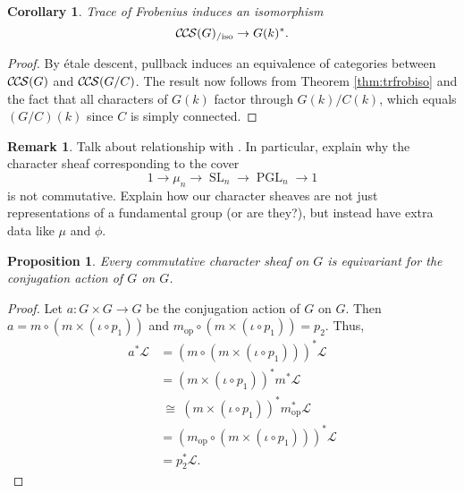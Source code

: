 \documentclass[10pt]{amsart}
\theoremstyle{plain}
\newtheorem{proposition}[theorem]{Proposition}
\newtheorem{corollary}[theorem]{Corollary}
\theoremstyle{definition}
\newtheorem{remark}[theorem]{Remark}
\newcommand{\Fq}{k}
\DeclareMathOperator{\SL}{SL}
\DeclareMathOperator{\PGL}{PGL}
\newcommand{\op}{_{\operatorname{op}}}
\newcommand{\iso}{{\ \cong\ }}
\newcommand{\cs}[1]{{\mathcal{#1}}}
\newcommand{\CCS}{{\mathcal{C\hskip-.8pt C\hskip-0.8pt S}}}
\newcommand{\CCSiso}[1]{\CCS(#1)_{/\text{iso}}}
\begin{document}
 \begin{corollary}
 Trace of Frobenius induces an isomorphism
 \[
 \CCSiso{G} \to G(\Fq)^*.
 \]
 \end{corollary}
 
 \begin{proof}
 By \'etale descent, pullback induces an equivalence of categories between $\CCS(G)$ and $\CCS(G/C)$. 
  The result now follows from Theorem \ref{thm:trfrobiso} and the fact that all characters of $G(\Fq)$ factor through
 $G(\Fq)/C(\Fq)$, which equals $(G/C)(\Fq)$ since $C$ is simply connected.
 \end{proof}
 
 \begin{remark}
 Talk about relationship with \cite{kamgarpour:09a}.  In particular, explain why the character sheaf corresponding
 to the cover
 \[
 1 \to \mu_n \to \SL_n \to \PGL_n \to 1
 \]
 is not commutative.  Explain how our character sheaves are not just representations of a fundamental group
 (or are they?), but instead have extra data like $\mu$ and $\phi$.
 \end{remark}
 
\begin{proposition}
Every commutative character sheaf on $G$ is equivariant for the conjugation action of $G$ on $G$.
\end{proposition}

\begin{proof}
Let $a : G \times G \to G$ be the conjugation action of $G$ on $G$. Then $a = m \circ (m \times (\iota \circ p_1))$ and $m\op \circ (m \times (\iota \circ p_1)) = p_2$. Thus,
\begin{align*}
a^* \cs{L} 
&= (m \circ (m \times (\iota \circ p_1)))^* \cs{L}\\
&= (m \times (\iota \circ p_1))^* m^* \cs{L}\\
&\iso (m \times (\iota \circ p_1))^* m\op^* \cs{L}\\
&= (m\op \circ (m \times (\iota \circ p_1)))^* \cs{L}\\
&= p_2^*\cs{L}.
\end{align*}
\end{proof}
 
\end{document}
